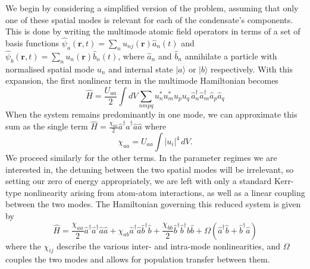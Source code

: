 \documentclass{iopart}
\begin{document}
We begin by considering a simplified version of the problem, assuming that only one of these spatial modes is relevant for each of the condensate's components.  This is done by writing the multimode atomic field operators in terms of a set of basis functions $\hat{\psi}_a({\mathbf{r}},t) = \sum_n u_{n j}({\mathbf{r}}) \hat{a}_{n}(t)$ and $\hat{\psi}_b({\mathbf{r}},t) = \sum_n u_{n}({\mathbf{r}}) \hat{b}_{n}(t)$, where $\hat{a}_{n}$ and $\hat{b}_{n}$ annihilate a particle with normalised spatial mode $u_n$ and internal state $|a\rangle$ or $|b\rangle$ respectively. With this expansion, the first nonlinear term in the multimode Hamiltonian becomes
\begin{equation}
\hat{H} = \frac{U_{aa}}{2} \int dV \sum_{nmpq} u_n^* u_m^* u_p u_q \, \hat{a}^{\dagger}_{n} \hat{a}^{\dagger}_{m} \hat{a}_{p} \hat{a}_{q} 
\end{equation}
When the system remains predominantly in one mode, we can approximate this sum as the single term $\hat{H} = \frac{\chi_{aa}}{2} \hat{a}^{\dagger} \hat{a}^{\dagger} \hat{a} \hat{a}$ where
\begin{equation}
\chi_{aa} = U_{aa} \int |u_i|^4 \, dV.
\label{eqChiUequivalence}
\end{equation}
We proceed similarly for the other terms.  In the parameter regimes we are interested in, the detuning between the two spatial modes will be irrelevant, so setting our zero of energy appropriately, we are left with only a standard Kerr-type nonlinearity arising from atom-atom interactions, as well as a linear coupling between the two modes.  The Hamiltonian governing this reduced system is given by
\begin{equation}
\hat{H} = \frac{\chi_{aa}}{2} \hat{a}^{\dagger} \hat{a}^{\dagger} \hat{a} \hat{a}
          + \chi_{ab} \hat{a}^{\dagger} \hat{a} \hat{b}^{\dagger} \hat{b}
          + \frac{\chi_{bb}}{2} \hat{b}^{\dagger} \hat{b}^{\dagger} \hat{b} \hat{b}
          + \Omega (\hat{a}^{\dagger} \hat{b} + \hat{b}^{\dagger}  \hat{a} )
\label{eqTwoModeHamiltonian}
\end{equation}
where the $\chi_{ij}$ describe the various inter- and intra-mode nonlinearities, and $\Omega$ couples the two modes and allows for population transfer between them.
\end{document}
